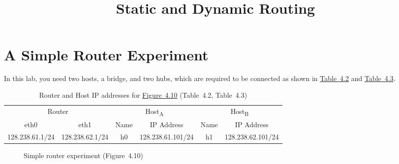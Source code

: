 \documentclass{../UTNetLab}
\title{Static and Dynamic Routing}
\begin{document}
\part{A Simple Router Experiment}
In this lab, you need two hosts, a bridge, and two hubs, which are required to be connected as shown in \hyperref[tab:4.2]{Table~4.2} and \hyperref[tab:4.3]{Table~4.3}.
    \begin{table}[H]
        \caption{Router and Host IP addresses for \hyperref[fig:4.10]{Figure~4.10} (Table~4.2\label{tab:4.2}, Table~4.3\label{tab:4.3})}
        \centering
        \begin{tabular}{ *2c | *2c | *2c }
            \hline \hline
            \multicolumn{2}{c|}{Router} & \multicolumn{2}{c|}{Host\textsubscript{A}} & \multicolumn{2}{c}{Host\textsubscript{B}} \\
            eth0 & eth1 & Name & IP Address & Name & IP Address \\
            \hline 
            128.238.61.1/24 & 128.238.62.1/24 & h0 & 128.238.61.101/24 & h1 & 128.238.62.101/24 \\
            \hline \hline
            \end{tabular}
    \end{table}

    \begin{figure}[H]
        \centering
        \caption{Simple router experiment (Figure~4.10)}\label{fig:4.10}
    \end{figure}
\end{document}
